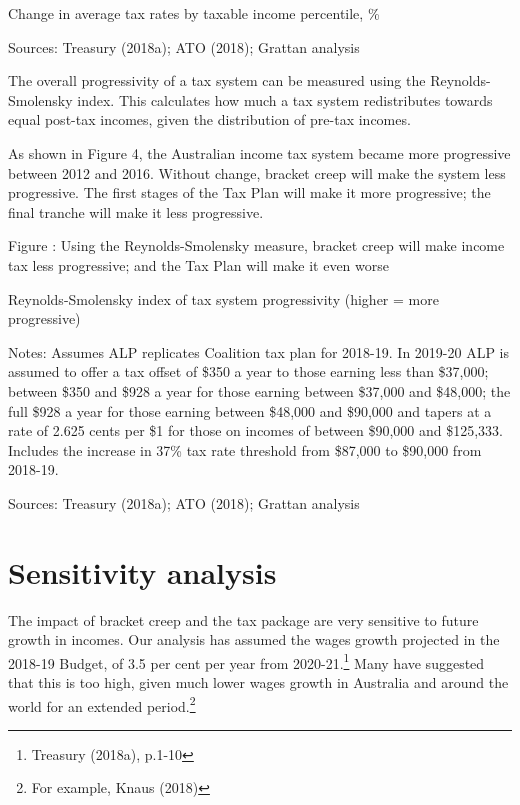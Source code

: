 \documentclass[submission]{grattan}\usepackage[]{graphicx}\usepackage[]{color}
\begin{document}
Change in average tax rates by taxable income percentile, \%



Sources: Treasury (2018a); ATO (2018); Grattan analysis

The overall progressivity of a tax system can be measured using the Reynolds-Smolensky index. This calculates how much a tax system redistributes towards equal post-tax incomes, given the distribution of pre-tax incomes.

As shown in Figure 4, the Australian income tax system became more progressive between 2012 and 2016. Without change, bracket creep will make the system less progressive. The first stages of the Tax Plan will make it more progressive; the final tranche will make it less progressive.

Figure : Using the Reynolds-Smolensky measure, bracket creep will make income tax less progressive; and the Tax Plan will make it even worse

Reynolds-Smolensky index of tax system progressivity (higher = more progressive)



Notes: Assumes ALP replicates Coalition tax plan for 2018-19. In 2019-20 ALP is assumed to offer a tax offset of \$350 a year to those earning less than \$37,000; between \$350 and \$928 a year for those earning between \$37,000 and \$48,000; the full \$928 a year for those earning between \$48,000 and \$90,000 and tapers at a rate of 2.625 cents per \$1 for those on incomes of between \$90,000 and \$125,333. Includes the increase in 37\% tax rate threshold from \$87,000 to \$90,000 from 2018-19.

Sources: Treasury (2018a); ATO (2018); Grattan analysis

\section{Sensitivity analysis}\label{sec:sensitivity-analysis}

The impact of bracket creep and the tax package are very sensitive to future growth in incomes. Our analysis has assumed the wages growth projected in the 2018-19 Budget, of 3.5 per cent per year from 2020-21.\footnote{Treasury (2018a), p.1-10} Many have suggested that this is too high, given much lower wages growth in Australia and around the world for an extended period.\footnote{For example, Knaus (2018)}
\end{document}
